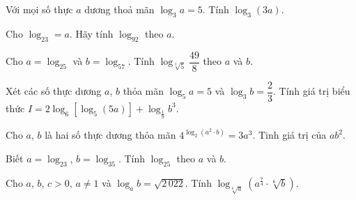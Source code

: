 \begin{ex}%
	Với mọi số thực $a$ dương  thoả mãn $\log _3a=5$. Tính $\log _3(3a)$.
\end{ex}

\begin{ex}%
	Cho $\log  _23=a$. Hãy tính $\log _92$ theo $a$.
\end{ex}

\begin{ex}%
	 Cho $a=\log _25$ và $b=\log _57$. Tính $\log _{\sqrt[3]{5}}\dfrac{49}{8}$ theo $a$ và $b$.
\end{ex}

\begin{ex}%
	Xét các số thực dương $a$, $b$ thỏa mãn $\log _5a=5$ và $\log _3b=\dfrac{2}{3}$.  Tính giá trị biểu thức $I=2\log _6\left[\log _5(5a)\right]+\log _{\tfrac{1}{9}}b^3$.
\end{ex}

\begin{ex}%
	Cho $a$, $b$ là hai số thực dương thỏa mãn $4^{\log _2\left(a^2\cdot b\right)}=3a^3$. Tinh giá  trị của $ab^2$.
\end{ex}

\begin{ex}%
	Biết $a=\log _23$, $b=\log _35$. Tính $\log _25$ theo $a$  và $b$.
\end{ex}

\begin{ex}%
	Cho $a$, $b$, $c>0$, $a\neq 1$ và  $\log _ab=\sqrt{2\,022}$. Tính $\log _{\sqrt[6]{a}}\left(a^{\tfrac{7}{4}}\cdot \sqrt[6]{b}\right)$.
\end{ex}

